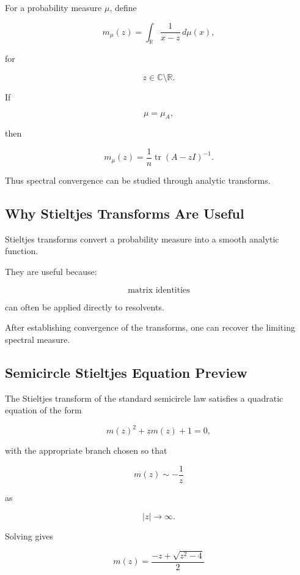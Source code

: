 For a probability measure \(\mu\), define

\[
\boxed{
m_\mu(z)
=
\int_{\mathbb{R}}
\frac1{x-z}
\,d\mu(x),
}
\]

for

\[
z\in\mathbb{C}\setminus\mathbb{R}.
\]

If

\[
\mu=\mu_A,
\]

then

\[
m_\mu(z)
=
\frac1n
\operatorname{tr}(A-zI)^{-1}.
\]

Thus spectral convergence can be studied through analytic transforms.

\subsection{Why Stieltjes Transforms Are Useful}
\label{subsec:why-stieltjes-transform}

Stieltjes transforms convert a probability measure into a smooth
analytic function.

They are useful because:

\[
\boxed{
\text{matrix identities}
}
\]

can often be applied directly to resolvents.

After establishing convergence of the transforms, one can recover the
limiting spectral measure.

\subsection{Semicircle Stieltjes Equation Preview}
\label{subsec:semicircle-stieltjes-equation}

The Stieltjes transform of the standard semicircle law satisfies a
quadratic equation of the form

\[
\boxed{
m(z)^2+zm(z)+1=0,
}
\]

with the appropriate branch chosen so that

\[
m(z)
\sim
-\frac1z
\]

as

\[
|z|\to\infty.
\]

Solving gives

\[
\boxed{
m(z)
=
\frac{
-z+\sqrt{z^2-4}
}{2}
}
\]


